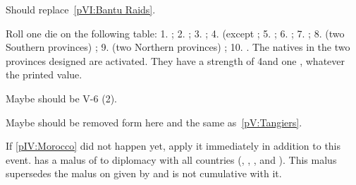 
\begin{todo}
  Should replace~\ref{pVI:Bantu Raids}.
\end{todo}

\phevnt
\aparag Roll one die on the following table: 1. \granderegionSenegal ;
2. \granderegionCotedivoire ; 3. \granderegionCotedor ;
4. \granderegionCameroun (except ; 5. \granderegionGabon
; 6. \granderegionCongo ; 7. \granderegionAngola ; 8. \granderegionNyasa (two
Southern provinces) ; 9. \granderegionNyasa (two Northern provinces) ;
10. \granderegionKenya.
\bparag The natives in the two provinces designed are activated. They have a
strength of 4\LD and one \LeaderG, whatever the printed value.

\begin{todo}
  Maybe should be V-6 (2).
\end{todo}




\begin{todo}
  Maybe should be removed form here and the same as~\ref{pV:Tangiers}.
\end{todo}

\effetlong
\aparag If \ref{pIV:Morocco} did not happen yet, apply it immediately in
addition to this event.
\aparag \TUR has a malus of  to diplomacy with all
 countries (\paysCyrenaique, \paysTripoli, \paysTunisie,
\paysAlgerie and \paysMaroc).
\bparag This malus supersedes the malus on \paysmaroc given by
 and is not cumulative with it.

\stopevents


